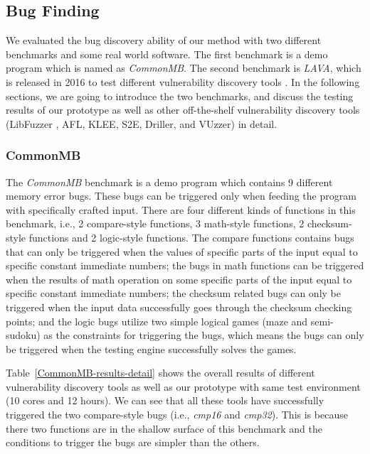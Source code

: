 \subsection{Bug Finding}
We evaluated the bug discovery ability of our method with two different benchmarks and some real world software. The first benchmark is a demo program which is named as \emph{CommonMB}. The second benchmark is \emph{LAVA}, which is released in 2016 to test different vulnerability discovery tools \cite{dolan2016lava}. In the following sections, we are going to introduce the two benchmarks, and discuss the testing results of our prototype as well as other off-the-shelf vulnerability discovery tools (LibFuzzer \cite{libfuzzer}, AFL, KLEE, S2E, Driller, and VUzzer) in detail.

\subsubsection{CommonMB}
\noindent The \emph{CommonMB} benchmark is a demo program which contains 9 different memory error bugs. These bugs can be triggered only when feeding the program with specifically crafted input. There are four different kinds of functions in this benchmark, i.e., 2 compare-style functions, 3 math-style functions, 2 checksum-style functions and 2 logic-style functions. The compare functions contains bugs that can only be triggered when the values of specific parts of the input equal to specific constant immediate numbers; the bugs in math functions can be triggered when the results of math operation on some specific parts of the input equal to specific constant immediate numbers; the checksum related bugs can only be triggered when the input data successfully goes through the checksum checking points; and the logic bugs utilize two simple logical games (maze and semi-sudoku) as the constraints for triggering the bugs, which means the bugs can only be triggered when the testing engine successfully solves the games.

Table~\ref{CommonMB-results-detail} shows the overall results of different vulnerability discovery tools as well as our prototype with same test environment (10 cores and 12 hours).
We can see that all these tools have successfully triggered the two compare-style bugs (i.e., \textit{cmp16} and \textit{cmp32}). This is because there two functions are in the shallow surface of this benchmark and the conditions to trigger the bugs are simpler than the others.  

